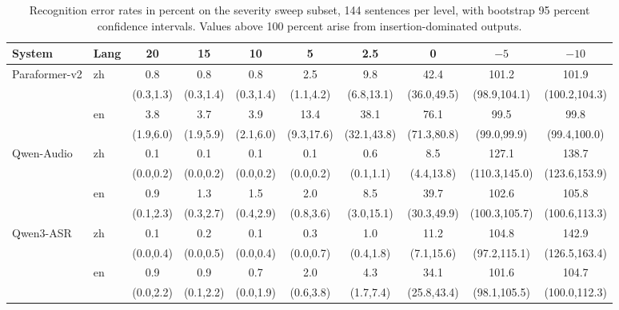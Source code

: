 \begin{table}[h]
\centering
\caption{Recognition error rates in percent on the severity sweep subset,
144 sentences per level, with bootstrap 95 percent confidence intervals.
Values above 100 percent arise from insertion-dominated outputs.}
\label{tab:sweep}
\footnotesize
\setlength{\tabcolsep}{1.9pt}
\begin{tabular}{llcccccccc}
\toprule
System & Lang & 20 & 15 & 10 & 5 & 2.5 & 0 & $-5$ & $-10$ \\
\midrule
Paraformer-v2 & zh & 0.8 & 0.8 & 0.8 & 2.5 & 9.8 & 42.4 & 101.2 & 101.9 \\
 &  & (0.3,1.3) & (0.3,1.4) & (0.3,1.4) & (1.1,4.2) & (6.8,13.1) & (36.0,49.5) & (98.9,104.1) & (100.2,104.3) \\
 & en & 3.8 & 3.7 & 3.9 & 13.4 & 38.1 & 76.1 & 99.5 & 99.8 \\
 &  & (1.9,6.0) & (1.9,5.9) & (2.1,6.0) & (9.3,17.6) & (32.1,43.8) & (71.3,80.8) & (99.0,99.9) & (99.4,100.0) \\
Qwen-Audio & zh & 0.1 & 0.1 & 0.1 & 0.1 & 0.6 & 8.5 & 127.1 & 138.7 \\
 &  & (0.0,0.2) & (0.0,0.2) & (0.0,0.2) & (0.0,0.2) & (0.1,1.1) & (4.4,13.8) & (110.3,145.0) & (123.6,153.9) \\
 & en & 0.9 & 1.3 & 1.5 & 2.0 & 8.5 & 39.7 & 102.6 & 105.8 \\
 &  & (0.1,2.3) & (0.3,2.7) & (0.4,2.9) & (0.8,3.6) & (3.0,15.1) & (30.3,49.9) & (100.3,105.7) & (100.6,113.3) \\
Qwen3-ASR & zh & 0.1 & 0.2 & 0.1 & 0.3 & 1.0 & 11.2 & 104.8 & 142.9 \\
 &  & (0.0,0.4) & (0.0,0.5) & (0.0,0.4) & (0.0,0.7) & (0.4,1.8) & (7.1,15.6) & (97.2,115.1) & (126.5,163.4) \\
 & en & 0.9 & 0.9 & 0.7 & 2.0 & 4.3 & 34.1 & 101.6 & 104.7 \\
 &  & (0.0,2.2) & (0.1,2.2) & (0.0,1.9) & (0.6,3.8) & (1.7,7.4) & (25.8,43.4) & (98.1,105.5) & (100.0,112.3) \\
\bottomrule
\end{tabular}
\end{table}

